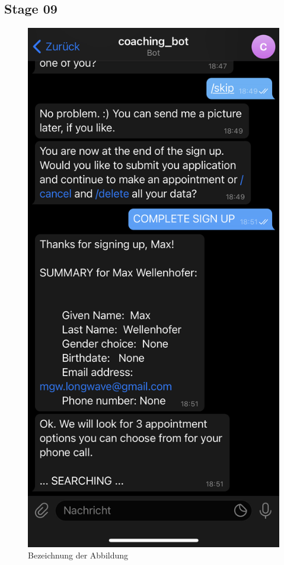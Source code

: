 \subsection{Stage 09}
\begin{figure} %
	\centering
	\includegraphics{images/coaching_bot_dummy_screenshot.jpeg}
	\caption{Bezeichnung der Abbildung}
	\label{a10}
\end{figure}

